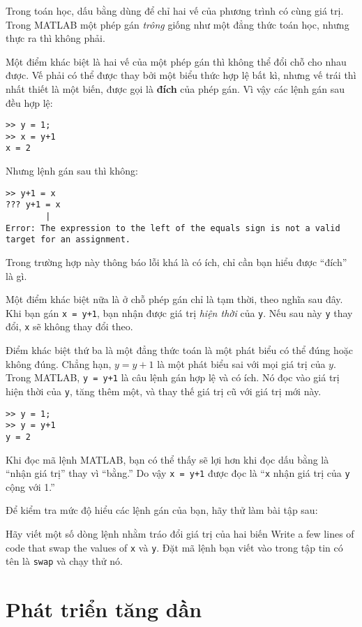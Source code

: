 \documentclass[12pt]{book}
\begin{document}
Trong toán học, dấu bằng dùng để chỉ hai vế của phương trình có
cùng giá trị. Trong MATLAB một phép gán {\em trông} giống như một
đẳng thức toán học, nhưng thực ra thì không phải.

Một điểm khác biệt là hai vế của một phép gán thì không thể đổi chỗ
cho nhau được. Vế phải có thể được thay bởi một biểu thức hợp lệ
bất kì, nhưng vế trái thì nhất thiết là một biến, được gọi là 
{\bf đích} của phép gán. Vì vậy các lệnh gán sau đều hợp lệ:

\begin{verbatim}
>> y = 1;
>> x = y+1
x = 2
\end{verbatim}
%
Nhưng lệnh gán sau thì không:

\begin{verbatim}
>> y+1 = x
??? y+1 = x
        |
Error: The expression to the left of the equals sign is not a valid 
target for an assignment.
\end{verbatim}
%
Trong trường hợp này thông báo lỗi khá là có ích, chỉ cần bạn hiểu
được ``đích'' là gì.

Một điểm khác biệt nữa là ở chỗ phép gán chỉ là tạm thời, theo nghĩa
sau đây. Khi bạn gán {\tt x = y+1}, bạn nhận được giá trị 
{\em hiện thời} của {\tt y}.  Nếu sau này {\tt y} thay đổi, {\tt x}
sẽ không thay đổi theo.

Điểm khác biệt thứ ba là một đẳng thức toán là một phát biểu có thể
đúng hoặc không đúng. Chẳng hạn, $y = y+1$ là một phát biểu
sai với mọi giá trị của $y$.  Trong MATLAB, {\tt y = y+1} là câu lệnh gán
hợp lệ và có ích. Nó đọc vào giá trị hiện thời của {\tt y}, tăng thêm một, 
và thay thế giá trị cũ với giá trị mới này.

\begin{verbatim}
>> y = 1;
>> y = y+1
y = 2
\end{verbatim}
%
Khi đọc mã lệnh MATLAB, bạn có thể thấy sẽ lợi hơn khi 
đọc dấu bằng là ``nhận giá trị'' thay vì ``bằng.''  Do vậy {\tt x = y+1}
được đọc là ``{\tt x} nhận giá trị của {\tt y} cộng với 1.''

Để kiểm tra mức độ hiểu các lệnh gán của bạn, hãy thử làm
bài tập sau:

\begin{ex}
Hãy viết một số dòng lệnh nhằm tráo đổi giá trị của hai biến
Write a few lines of code that swap the values of
{\tt x} và {\tt y}. Đặt mã lệnh bạn viết vào trong tập tin có tên 
là {\tt swap} và chạy thử nó.
\end{ex}


\section{Phát triển tăng dần}
\end{document}
